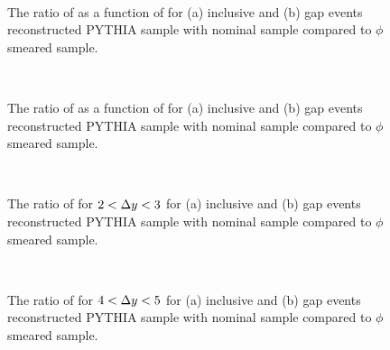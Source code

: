 \begin{figure}
\centering
\mbox{
              \quad
              \quad
                              }
\caption[Uncertainty bands due to the jet $\phi$ resolution for \mean{\cosdphi{}}]{
The ratio of \mean{\cosdphi{}} as a function of \dy{} for (a) inclusive and (b) gap events reconstructed PYTHIA sample with nominal sample compared to $\phi$ smeared sample.
\label{GBJ2:ResoPhi:cos}}
\end{figure}

\begin{figure}
\centering
\mbox{
              \quad
              \quad
                              }
\caption[Uncertainty bands due to the jet $\phi$ resolution for \mean{\costwodphi{}}]{
The ratio of \mean{\costwodphi{}} as a function of \dy{} for (a) inclusive and (b) gap events reconstructed PYTHIA sample with nominal sample compared to $\phi$ smeared sample.
\label{GBJ2:ResoPhi:cos2}}
\end{figure}


\begin{figure}
\centering
\mbox{
              \quad
              \quad
                              }
\caption[Uncertainty bands due to the jet $\phi$ resolution for \dphiDist{} for $2<\dy{}<3$]{
The ratio of \dphiDist{} for $2<\dy{}<3$ for (a) inclusive and (b) gap events reconstructed PYTHIA sample with nominal sample compared to $\phi$ smeared sample.
\label{GBJ2:ResoPhi:dphi23}}
\end{figure}


\begin{figure}
\centering
\mbox{
              \quad
              \quad
                              }
\caption[Uncertainty bands due to the jet $\phi$ resolution for \dphiDist{} for $4<\dy{}<5$]{
The ratio of \dphiDist{} for $4<\dy{}<5$ for (a) inclusive and (b) gap events reconstructed PYTHIA sample with nominal sample compared to $\phi$ smeared sample.
\label{GBJ2:ResoPhi:dphi45}}
\end{figure}




